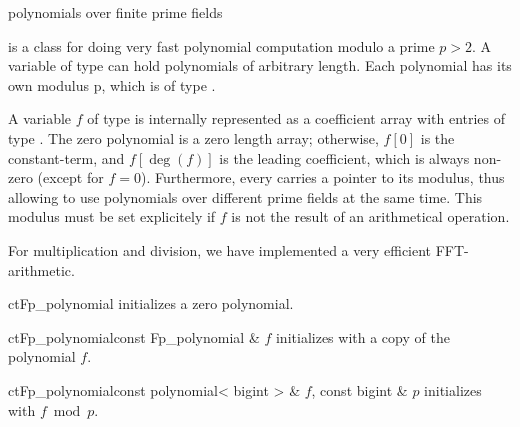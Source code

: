 


\NAME

 \dotfill polynomials over finite prime fields



\ABSTRACT

 is a class for doing very fast polynomial computation modulo a prime $p >
2$.  A variable of type  can hold polynomials of arbitrary length.  Each
polynomial has its own modulus p, which is of type .



\DESCRIPTION

A variable $f$ of type  is internally represented as a coefficient array
with entries of type .  The zero polynomial is a zero length array; otherwise,
$f[0]$ is the constant-term, and $f[\deg(f)]$ is the leading coefficient, which is always
non-zero (except for $f = 0$).  Furthermore, every  carries a pointer to its
modulus, thus allowing to use polynomials over different prime fields at the same time.  This
modulus
must be set explicitely if $f$ is not the result of an arithmetical operation.

For multiplication and division, we have implemented a very efficient FFT-arithmetic.



\CONS

\begin{fcode}{ct}{Fp_polynomial}{}
  initializes a zero polynomial.
\end{fcode}

\begin{fcode}{ct}{Fp_polynomial}{const Fp_polynomial & $f$}
  initializes with a copy of the polynomial $f$.
\end{fcode}

\begin{fcode}{ct}{Fp_polynomial}{const polynomial< bigint > & $f$, const bigint & $p$}
  initializes with $f \bmod p$.
\end{fcode}

